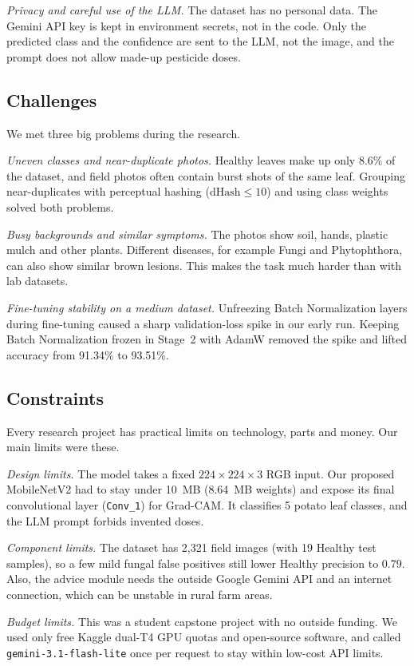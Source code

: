 \textit{Privacy and careful use of the LLM.} The dataset has no personal data. The Gemini API key is kept in environment secrets, not in the code. Only the predicted class and the confidence are sent to the LLM, not the image, and the prompt does not allow made-up pesticide doses.

\subsection{Challenges}
We met three big problems during the research.

\textit{Uneven classes and near-duplicate photos.} Healthy leaves make up only 8.6\% of the dataset, and field photos often contain burst shots of the same leaf. Grouping near-duplicates with perceptual hashing ($\text{dHash} \le 10$) and using class weights solved both problems.

\textit{Busy backgrounds and similar symptoms.} The photos show soil, hands, plastic mulch and other plants. Different diseases, for example Fungi and Phytophthora, can also show similar brown lesions. This makes the task much harder than with lab datasets.

\textit{Fine-tuning stability on a medium dataset.} Unfreezing Batch Normalization layers during fine-tuning caused a sharp validation-loss spike in our early run. Keeping Batch Normalization frozen in Stage~2 with AdamW removed the spike and lifted accuracy from 91.34\% to 93.51\%.

\subsection{Constraints}
Every research project has practical limits on technology, parts and money. Our main limits were these.

\textit{Design limits.} The model takes a fixed $224 \times 224 \times 3$ RGB input. Our proposed MobileNetV2 had to stay under 10~MB (8.64~MB weights) and expose its final convolutional layer (\texttt{Conv\_1}) for Grad-CAM. It classifies 5 potato leaf classes, and the LLM prompt forbids invented doses.

\textit{Component limits.} The dataset has 2,321 field images (with 19 Healthy test samples), so a few mild fungal false positives still lower Healthy precision to 0.79. Also, the advice module needs the outside Google Gemini API and an internet connection, which can be unstable in rural farm areas.

\textit{Budget limits.} This was a student capstone project with no outside funding. We used only free Kaggle dual-T4 GPU quotas and open-source software, and called \texttt{gemini-3.1-flash-lite} once per request to stay within low-cost API limits.

